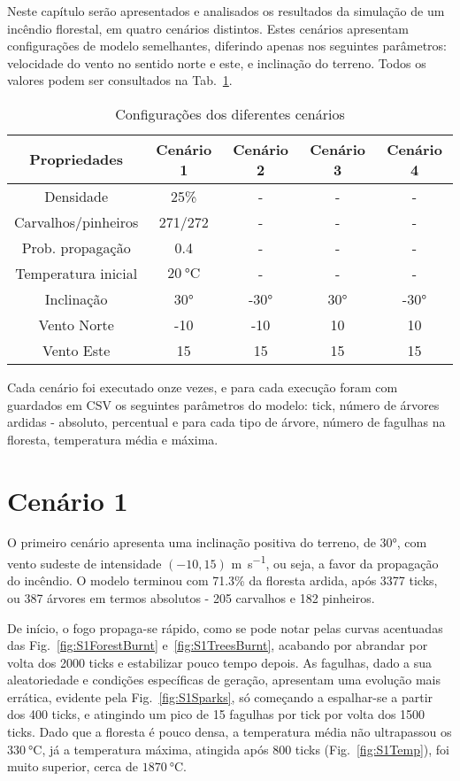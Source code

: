 Neste capítulo serão apresentados e analisados os resultados da simulação de um incêndio florestal, em quatro cenários distintos.
Estes cenários apresentam configurações de modelo semelhantes, diferindo apenas nos seguintes parâmetros: velocidade do vento no sentido norte e este, e inclinação do terreno.
Todos os valores podem ser consultados na Tab.~\ref{tab:scenarios}.

\begin{table}[tbhp]
    \centering
    \begin{tabular}{c|cccc}
    \hline
    \textbf{Propriedades} & \textbf{Cenário 1} & \textbf{Cenário 2} & \textbf{Cenário 3} & \textbf{Cenário 4} \\
    \hline
    Densidade & 25\% & - & - & - \\
    Carvalhos/pinheiros & 271/272 & - & - & - \\
    Prob.
    propagação & 0.4 & - & - & - \\
    Temperatura inicial & $\SI{20}{\degreeCelsius}$ & - & - & - \\
    Inclinação & \ang{30} & \ang{-30} & \ang{30} & \ang{-30} \\
    Vento Norte & -10 & -10 & 10 & 10 \\
    Vento Este & 15 & 15 & 15 & 15 \\
    \hline
    \end{tabular}
    \caption{Configurações dos diferentes cenários}
    \label{tab:scenarios}
\end{table}

Cada cenário foi executado onze vezes, e para cada execução foram com guardados em CSV os seguintes parâmetros do modelo: tick, número de árvores ardidas - absoluto, percentual e para cada tipo de árvore, número de fagulhas na floresta, temperatura média e máxima.

\section{Cenário 1}\label{sec:scenario1}

O primeiro cenário apresenta uma inclinação positiva do terreno, de \ang{30}, com vento sudeste de intensidade $(-10, 15)$ \si{\meter\per\second}, ou seja, a favor da propagação do incêndio.
O modelo terminou com 71.3\% da floresta ardida, após 3377 ticks, ou 387 árvores em termos absolutos - 205 carvalhos e 182 pinheiros.

De início, o fogo propaga-se rápido, como se pode notar pelas curvas acentuadas das Fig.~\ref{fig:S1ForestBurnt} e~\ref{fig:S1TreesBurnt}, acabando por abrandar por volta dos 2000 ticks e estabilizar pouco tempo depois.
As fagulhas, dado a sua aleatoriedade e condições específicas de geração, apresentam uma evolução mais errática, evidente pela Fig.~\ref{fig:S1Sparks}, só começando a espalhar-se a partir dos 400 ticks, e atingindo um pico de 15 fagulhas por tick por volta dos 1500 ticks.
Dado que a floresta é pouco densa, a temperatura média não ultrapassou os $\SI{330}{\degreeCelsius}$, já a temperatura máxima, atingida após 800 ticks (Fig.~\ref{fig:S1Temp}), foi muito superior, cerca de $\SI{1870}{\degreeCelsius}$.
